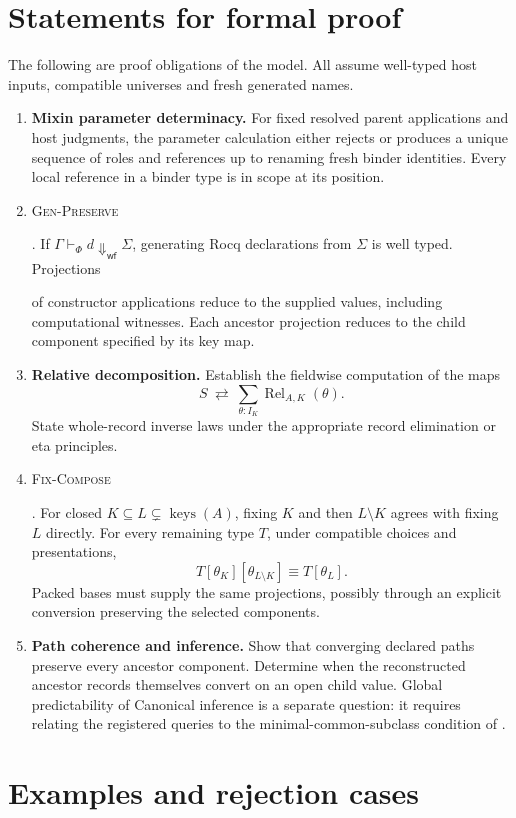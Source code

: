 \documentclass{article}
\newcommand{\keys}{\operatorname{keys}}
\newcommand{\rel}{\operatorname{Rel}}
\newcommand{\wf}{\mathsf{wf}}
\newcommand{\rdefn}[1]{\hypertarget{rule-#1}{\textsc{#1}}}
\begin{document}
\section{Statements for formal proof}
\label{sec:properties}
The following are proof obligations of the model. All assume well-typed
host inputs, compatible universes and fresh generated names.
\begin{enumerate}
\item \textbf{Mixin parameter determinacy.} For fixed resolved parent
      applications and host judgments, the parameter calculation either
      rejects or produces a unique sequence of roles and references up to
      renaming fresh binder identities. Every local reference in a binder
      type is in scope at its position.

\item \rdefn{Gen-Preserve}. If $\Gamma\vdash_\Phi d\Downarrow_{\wf}\Sigma$,
      generating Rocq declarations from $\Sigma$ is well typed. Projections

of constructor applications reduce to the supplied values, including
      computational witnesses. Each ancestor projection reduces to the
      child component specified by its key map.
\item \textbf{Relative decomposition.} Establish the fieldwise computation of the maps
      \[
          S \ \rightleftarrows\ \sum_{\theta:I_K}\rel_{A,K}(\theta).
      \]
      State whole-record inverse laws under
      the appropriate record elimination or eta principles.
\item \rdefn{Fix-Compose}. For closed $K\subseteq L\subsetneq\keys(A)$, fixing $K$ and
      then $L\setminus K$ agrees with fixing $L$ directly. For every
      remaining type $T$, under compatible choices and presentations,
      \[
      T[\theta_K][\theta_{L\setminus K}]\equiv T[\theta_L].
      \]
      Packed bases must supply the same projections, possibly through
      an explicit conversion preserving the selected components.
\item \textbf{Path coherence and inference.} Show that converging
      declared paths preserve every ancestor component. Determine when
      the reconstructed ancestor records themselves convert on an open
      child value. Global predictability of Canonical inference is a
      separate question: it requires relating the registered queries
      to the minimal-common-subclass condition of \cite{validating}.
\end{enumerate}

\section{Examples and rejection cases}
\label{sec:examples}
\end{document}
